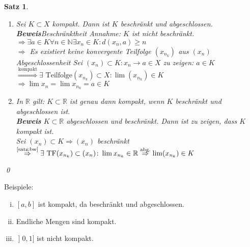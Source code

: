\documentclass[ngerman,titlepage,twoside, parskip=half*]{scrreprt}
\newcommand*{\N}{\mathbb{N}}
\newcommand*{\R}{\mathbb{R}}
\theoremstyle{break}
\newtheorem{theorem}{Satz}[section]
\theoremstyle{nonumberbreak}
\newcommand*{\lsofint}[1]{\mathopen{]}#1]}   %
\begin{document}
\begin{theorem}
\label{satz:beschr-abg}
\begin{enumerate}[(1)]
  \item Sei $K\subset X$ kompakt. Dann ist $K$ beschränkt und abgeschlossen.\\
    \textbf{Beweis}\textit{Beschränktheit} Annahme: $K$ ist nicht beschränkt.\\
    $\Rightarrow \exists a \in K \forall n \in \N \exists x_n \in K\colon d(x_n,a)\geq n$\\
    $\Rightarrow$ Es existiert keine konvergente Teilfolge $(x_{n_k})$ aus $(x_n)$\textnormal{\lightning}\\
    \textit{Abgeschlossenheit} Sei $(x_n)\subset K \colon x_n \rightarrow a\in X$ zu zeigen: $a\in K$\\
    $\stackrel{\text{kompakt}}{\Rightarrow} \exists \text{ Teilfolge} (x_{n_k})\subset X \colon\lim (x_{n_k})\in K$\\
    $\Rightarrow \lim x_n=\lim x_{n_k}=a\in K$
  \item In $\R$ gilt: $K\subset \R$ ist genau dann kompakt, wenn $K$ beschränkt und abgeschlossen ist.\\
    \textbf{Beweis} $K\subset \R$ abgeschlossen und beschränkt. Dann ist zu zeigen, dass $K$ kompakt ist.\\
    Sei $(x_n)\subset K \Rightarrow (x_n)$ beschränkt $\stackrel{\text{\autoref{satz:bw}}}{\Rightarrow}
    \exists \text{ TF} (x_{n_k})\subset (x_n)\colon \lim x_{n_k}\in\R\stackrel{\text{abg.}}{\Rightarrow}
    \lim (x_{n_k})\in K$
\end{enumerate}
\qed
\end{theorem}

Beispiele:
\begin{enumerate}[(i)]
  \item $[a,b]$ ist kompakt, da beschränkt und abgeschlossen.
  \item Endliche Mengen sind kompakt.
  \item $\lsofint{0,1}$ ist nicht kompakt.
\end{enumerate}
\end{document}
